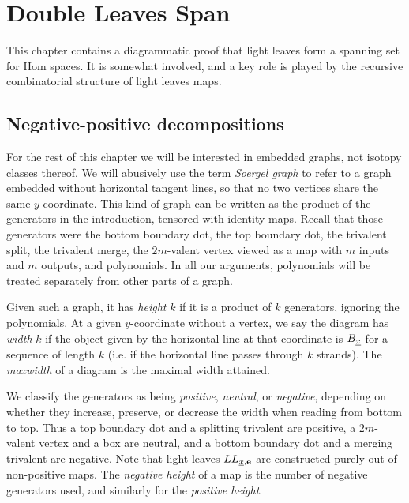 
\section{Double Leaves Span}
\label{sec-LLLproof}

This chapter contains a diagrammatic proof that light leaves form a spanning set for Hom spaces. It is somewhat involved, and a key role is played by the recursive combinatorial structure of light leaves maps.

\subsection{Negative-positive decompositions}
\label{subsec-negpos}

For the rest of this chapter we will be interested in embedded graphs, not isotopy classes thereof. We will abusively use the term \emph{Soergel graph} to refer to a graph embedded without
horizontal tangent lines, so that no two vertices share the same $y$-coordinate. This kind of graph can be written as the product of the generators in the introduction, tensored with
identity maps. Recall that those generators were the bottom boundary dot, the top boundary dot, the trivalent split, the trivalent merge, the $2m$-valent vertex viewed as a map with $m$ inputs and $m$
outputs, and polynomials. In all our arguments, polynomials will be treated separately from other parts of a graph.

Given such a graph, it has \emph{height} $k$ if it is a product of $k$ generators, ignoring the polynomials. At a given $y$-coordinate without a vertex, we say the diagram has \emph{width}
$k$ if the object given by the horizontal line at that coordinate is $B_{\underline{x}}$ for a sequence of length $k$ (i.e. if the horizontal line passes through $k$ strands). The \emph{maxwidth} of a
diagram is the maximal width attained.

We classify the generators as being \emph{positive}, \emph{neutral}, or \emph{negative}, depending on whether they increase, preserve, or decrease the width when reading from bottom to
top. Thus a top boundary dot and a splitting trivalent are positive, a $2m$-valent vertex and a box are neutral, and a bottom boundary dot and a merging trivalent are negative. Note that
light leaves $LL_{{\underline{x}},{\mathbf e}}$ are constructed purely out of non-positive maps. The \emph{negative height} of a map is the number of negative generators used, and similarly for the
\emph{positive height}.

